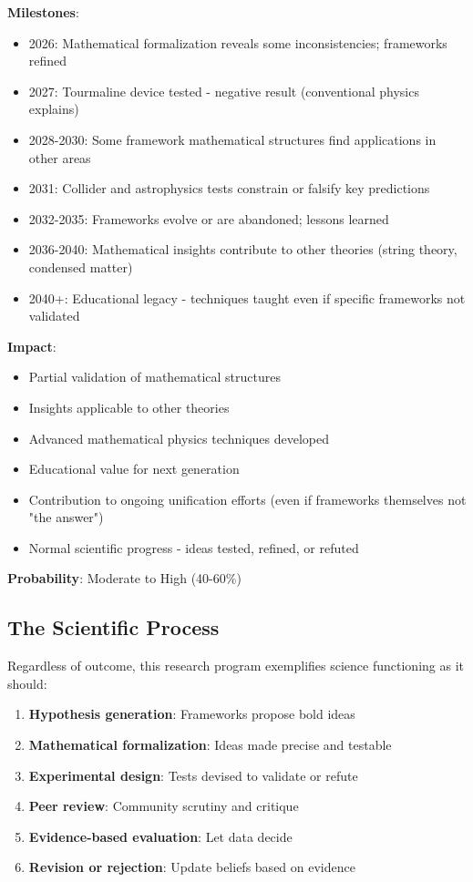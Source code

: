 \textbf{Milestones}:
\begin{itemize}
    \item 2026: Mathematical formalization reveals some inconsistencies; frameworks refined
    \item 2027: Tourmaline device tested - negative result (conventional physics explains)
    \item 2028-2030: Some framework mathematical structures find applications in other areas
    \item 2031: Collider and astrophysics tests constrain or falsify key predictions
    \item 2032-2035: Frameworks evolve or are abandoned; lessons learned
    \item 2036-2040: Mathematical insights contribute to other theories (string theory, condensed matter)
    \item 2040+: Educational legacy - techniques taught even if specific frameworks not validated
\end{itemize}

\textbf{Impact}:
\begin{itemize}
    \item Partial validation of mathematical structures
    \item Insights applicable to other theories
    \item Advanced mathematical physics techniques developed
    \item Educational value for next generation
    \item Contribution to ongoing unification efforts (even if frameworks themselves not "the answer")
    \item Normal scientific progress - ideas tested, refined, or refuted
\end{itemize}

\textbf{Probability}: Moderate to High (40-60\%)

\subsection{The Scientific Process}

Regardless of outcome, this research program exemplifies science functioning as it should:

\begin{enumerate}
    \item \textbf{Hypothesis generation}: Frameworks propose bold ideas
    \item \textbf{Mathematical formalization}: Ideas made precise and testable
    \item \textbf{Experimental design}: Tests devised to validate or refute
    \item \textbf{Peer review}: Community scrutiny and critique
    \item \textbf{Evidence-based evaluation}: Let data decide
    \item \textbf{Revision or rejection}: Update beliefs based on evidence
\end{enumerate}

